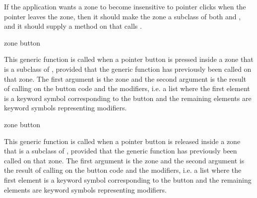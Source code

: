 If the application wants a zone to become insensitive to pointer clicks
when the pointer leaves the zone, then it should make the zone a
subclass of both  and , and it should
supply a method on  that calls . 

 {zone button}

This generic function is called when a pointer button is pressed
inside a zone that is a subclass of , provided that
the generic function  has previously been called on
that zone.  The first argument is the zone and the second argument is
the result of calling  on the button
code and the modifiers, i.e. a list where the first element is a
keyword symbol corresponding to the button and the remaining elements
are keyword symbols representing modifiers.

 {zone button}

This generic function is called when a pointer button is released
inside a zone that is a subclass of , provided that
the generic function  has previously been called on
that zone.  The first argument is the zone and the second argument is
the result of calling  on the button
code and the modifiers, i.e. a list where the first element is a
keyword symbol corresponding to the button and the remaining elements
are keyword symbols representing modifiers.


